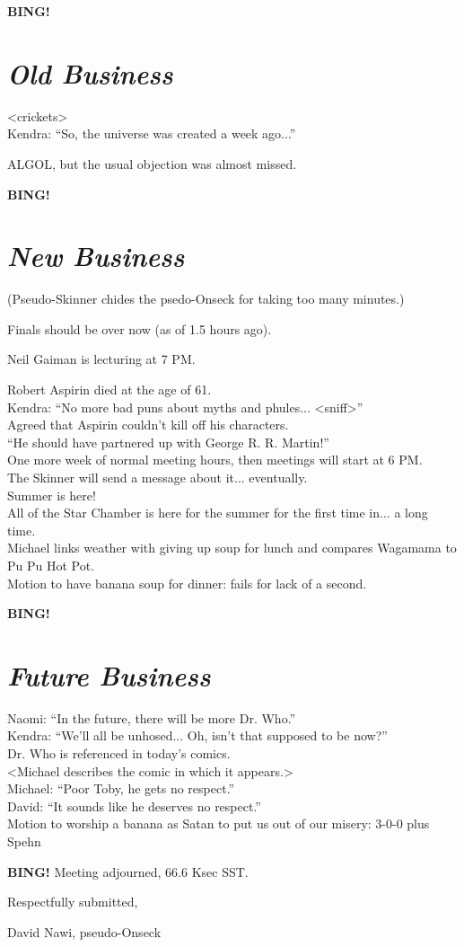 \documentclass[10pt]{article}
\newcommand{\bing}{{\bf BING!} }
\newcommand{\goto}[1]{\bing \vskip 12pt \section*{{\em{#1}}}}
\newcommand{\ps}{ plus Spehn\xspace}
\begin{document}
\goto{Old Business}

<crickets>\\

Kendra: ``So, the universe was created a week ago...''

ALGOL, but the usual objection was almost missed.

\goto{New Business}

(Pseudo-Skinner chides the psedo-Onseck for taking too many minutes.)

Finals should be over now (as of 1.5 hours ago).

Neil Gaiman is lecturing at 7 PM.

Robert Aspirin died at the age of 61.\\
Kendra: ``No more bad puns about myths and phules... <sniff>''\\
Agreed that Aspirin couldn't kill off his characters.\\
``He should have partnered up with George R. R. Martin!''\\

One more week of normal meeting hours, then meetings will start at 6 PM.\\
The Skinner will send a message about it... eventually.\\

Summer is here!\\
All of the Star Chamber is here for the summer for the first time in... a long time.\\

Michael links weather with giving up soup for lunch and compares Wagamama to Pu Pu Hot Pot.\\

Motion to have banana soup for dinner: fails for lack of a second.

\goto{Future Business}

Naomi: ``In the future, there will be more Dr. Who.''\\

Kendra: ``We'll all be unhosed... Oh, isn't that supposed to be now?''\\

Dr. Who is referenced in today's comics.\\
<Michael describes the comic in which it appears.>\\
Michael: ``Poor Toby, he gets no respect.''\\
David: ``It sounds like he deserves no respect.''\\

Motion to worship a banana as Satan to put us out of our misery: 3-0-0 \ps

\bing
\noindent
Meeting adjourned, 66.6 Ksec SST.

\vspace{18pt}

\centerline{Respectfully submitted,}
\centerline{David Nawi, pseudo-Onseck}
\end{document}
